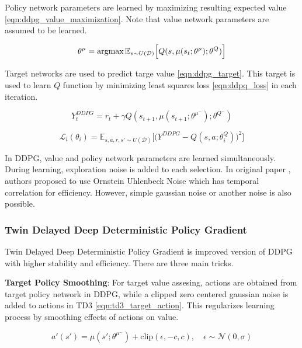Policy network parameters are learned by maximizing resulting expected value \ref{eqn:ddpg_value_maximization}. Note that value network parameters are assumed to be learned.

\begin{equation}
\label{eqn:ddpg_value_maximization}
\theta^\mu = \operatorname{\textup{argmax}} \mathbb{E}_{s \sim U(\mathcal{D})} \Big[ Q(s, \mu(s_t;\theta^\mu);\theta^Q) \Big]
\end{equation}
 
Target networks are used to predict targe value \ref{eqn:ddpg_target}. This target is used to learn $Q$ function by minimizing least squares loss \ref{eqn:ddpq_loss} in each iteration.

\begin{equation}
\label{eqn:ddpg_target}
Y_t^{DDPG} = r_t + \gamma Q(s_{t+1}, \mu(s_{t+1};\theta^{\mu^-});\theta^{Q^-})
\end{equation}

\begin{equation}
\label{eqn:ddpg_loss}
\mathcal{L}_i(\theta_i) = \mathbb{E}_{s,a,r,s'\sim U(\mathcal{D})}\Big[\big( Y^{DDPG} - Q(s,a;\theta^Q_i) \big) ^ 2 \Big]
\end{equation}

In DDPG, value and policy network parameters are learned simultaneously. During learning, exploration noise is added to each selection. In original paper \cite{lillicrap_continuous_2019}, authors proposed to use Ornstein Uhlenbeck Noise \cite{uhlenbeck_theory_1930} which has temporal correlation for efficiency. However, simple gaussian noise or another noise is also possible.

\subsubsection{Twin Delayed Deep Deterministic Policy Gradient}
Twin Delayed Deep Deterministic Policy Gradient \cite{fujimoto_addressing_2018} is improved version of DDPG with higher stability and efficiency. There are three main tricks.

\textbf{Target Policy Smoothing}: For target value assesing, actions are obtained from target policy network in DDPG, while a clipped zero centered gaussian noise is added to actions in TD3 \ref{eqn:td3_target_action}. This regularizes learning process by smoothing effects of actions on value. 

\begin{equation}
\label{eqn:td3_target_action}
a'(s') = \mu(s';\theta^{\mu^-}) + \text{clip}(\epsilon, -c, c), \quad \epsilon \sim \mathcal{N}(0, \sigma)
\end{equation}


